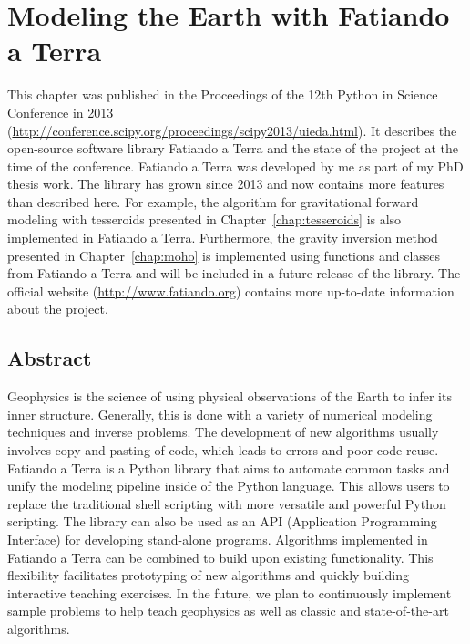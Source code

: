 \chapter{Modeling the Earth with Fatiando a Terra}
\label{chap:fatiando}


This chapter was published in the Proceedings of the 12th Python in Science
Conference in 2013
(\url{http://conference.scipy.org/proceedings/scipy2013/uieda.html}).
It describes the open-source software library Fatiando a Terra and the state of
the project at the time of the conference.
Fatiando a Terra was developed by me as part of my PhD thesis work.
The library has grown since 2013 and now contains more features than described
here.
For example, the algorithm for gravitational forward modeling with tesseroids
presented in Chapter~\ref{chap:tesseroids} is also implemented in Fatiando a
Terra.
Furthermore, the gravity inversion method presented in Chapter~\ref{chap:moho}
is implemented using functions and classes from Fatiando a Terra and will be
included in a future release of the library.
The official website (\url{http://www.fatiando.org}) contains more up-to-date
information about the project.



\section{Abstract}

Geophysics is the science of using physical observations of the Earth to infer
its inner structure. Generally, this is done with a variety of numerical
modeling techniques and inverse problems. The development of new algorithms
usually involves copy and pasting of code, which leads to errors and poor code
reuse. Fatiando a Terra is a Python library that aims to automate common tasks
and unify the modeling pipeline inside of the Python language. This allows
users to replace the traditional shell scripting with more versatile and
powerful Python scripting. The library can also be used as an API (Application
Programming Interface) for developing stand-alone programs.  Algorithms
implemented in Fatiando a Terra can be combined to build upon existing
functionality. This flexibility facilitates prototyping of new algorithms and
quickly building interactive teaching exercises. In the future, we plan to
continuously implement sample problems to help teach geophysics as well as
classic and state-of-the-art algorithms.




